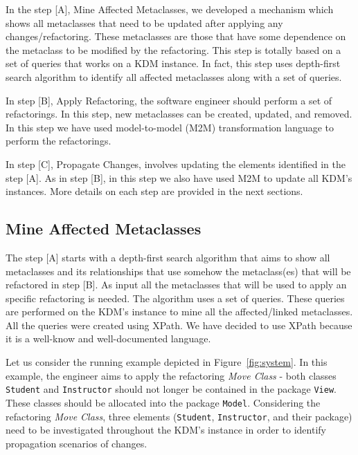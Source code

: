 In the step [A], Mine Affected Metaclasses, we developed a mechanism which shows all metaclasses that need to be updated after applying any changes/refactoring. These metaclasses are those that have some dependence on the metaclass to be modified by the refactoring. This step is totally based on a set of queries that works on a KDM instance. In fact, this step uses depth-first search algorithm to identify all affected metaclasses along with a set of queries.

In step [B], Apply Refactoring, the software engineer should perform a set of refactorings.  In this step, new metaclasses can be created, updated, and removed. %
In this step we have used model-to-model (M2M) transformation language to perform the refactorings.

In step [C], Propagate Changes, involves updating the elements identified in the step [A].  As in step [B], in this step we also have used M2M to update all KDM's instances. 
More details on each step are provided in the next sections.

\subsection{Mine Affected Metaclasses} %
\label{sub:mine_affected_metaclasses}

The step [A] starts with a depth-first search algorithm that aims to show all metaclasses and its relationships that use somehow the metaclass(es) that will be refactored in step [B]. As input all the metaclasses that will be used to apply an specific refactoring is needed. The algorithm uses a set of queries. These queries are performed on the KDM's instance to mine all the affected/linked metaclasses. All the queries were created using XPath. We have decided to use XPath because it is a well-know and well-documented language. 

Let us consider the running example depicted in Figure~\ref{fig:system}. In this example, the engineer aims to apply the refactoring \textit{Move Class} - both classes \texttt{Student} and \texttt{Instructor} should not longer be contained in the package \texttt{View}. These classes should be allocated into the package \texttt{Model}. Considering the refactoring \textit{Move Class}, three elements (\texttt{Student}, \texttt{Instructor}, and their package) need to be investigated throughout the KDM's instance in order to identify propagation scenarios of changes. 

